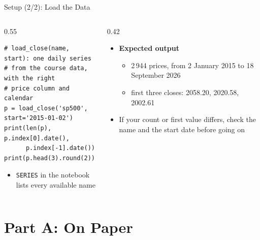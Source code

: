 \begin{frame}[fragile]{Setup (2/2): Load the Data}
\itemsize{\small}
\begin{columns}[T]
\begin{column}{0.55\textwidth}
\begin{lstlisting}
# load_close(name, start): one daily series
# from the course data, with the right
# price column and calendar
p = load_close('sp500', start='2015-01-02')
print(len(p), p.index[0].date(),
      p.index[-1].date())
print(p.head(3).round(2))
\end{lstlisting}
\begin{itemize}
    \item \texttt{SERIES} in the notebook lists every available name
\end{itemize}
\end{column}
\begin{column}{0.42\textwidth}
\begin{itemize}
    \item \textbf{Expected output}
    \begin{itemize}
        \item 2\,944 prices, from 2 January 2015 to 18 September 2026
        \item first three closes: 2058.20, 2020.58, 2002.61
    \end{itemize}
    \item If your count or first value differs, check the name and the start date before going on
\end{itemize}
\end{column}
\end{columns}
\end{frame}


\section{Part A: On Paper}

